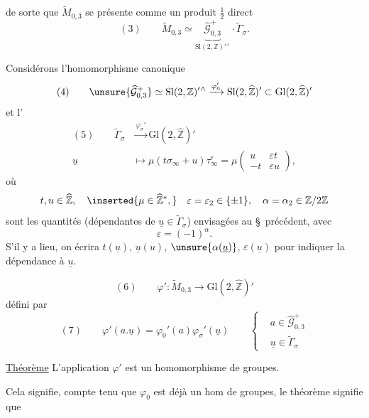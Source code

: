 
de sorte que $\widetilde M_{0,3}$ se présente comme un produit $\frac12$ direct
\[
(3)\qquad \widetilde M_{0,3}\simeq\underbrace{\widehat{\mathcal G}_{0,3}^{+}}_{\mathrm{Sl}(2,\mathbb Z)'{}^\wedge}\cdot\widetilde\Gamma_\sigma.
\]

Considérons l'homomorphisme canonique
\[
(4)\qquad \unsure{\widehat{\mathcal G}_{0,3}^{+}}\simeq\mathrm{Sl}(2,\mathbb Z)'{}^\wedge\xrightarrow{\varphi_0'}\mathrm{Sl}(2,\widehat{\mathbb Z})'\subset\mathrm{Gl}(2,\widehat{\mathbb Z})'
\]
et l'
\[
\begin{aligned}
(5)\qquad \widetilde\Gamma_\sigma&\xrightarrow{\varphi_\sigma'}\mathrm{Gl}(2,\widehat{\mathbb Z})'\\
\underline u&\longmapsto\mu(t\sigma_\infty+u)\tau_\infty^\varepsilon=\mu\begin{pmatrix}u&\varepsilon t\\-t&\varepsilon u\end{pmatrix},
\end{aligned}
\]
où 
\[
t,u\in\widehat{\mathbb Z},\quad\inserted{\mu\in\widehat{\mathbb Z}^{*},}\quad\varepsilon=\varepsilon_2\in\{\pm1\},\quad\alpha=\alpha_2\in\mathbb Z/2\mathbb Z
\]
sont les quantités (dépendantes de $\underline u\in\widetilde\Gamma_\sigma$) envisagées au \S\ précédent, avec
\[
\varepsilon=(-1)^\alpha.
\]
S'il y a lieu, on écrira $t(\underline u)$, $\underline u(u)$, $\unsure{\alpha(\underline u)}$, $\varepsilon(\underline u)$ pour indiquer la dépendance  à $\underline u$.

\[
(6)\qquad\varphi':\widetilde M_{0,3}\longrightarrow\mathrm{Gl}(2,\widehat{\mathbb Z})'
\]
défini par
\[
(7)\qquad\varphi'(a.\underline u)=\varphi_0'(a)\varphi_\sigma'(\underline u)\qquad\left\{\begin{aligned}&a\in\widehat{\mathcal G}_{0,3}^{+}\\&\underline u\in\widetilde\Gamma_\sigma\end{aligned}\right.
\]


\uline{Théorème} L'application $\varphi'$ est un homomorphisme de groupes.

Cela signifie, compte tenu que $\varphi_0$ est déjà un hom de groupes, le théorème signifie que


